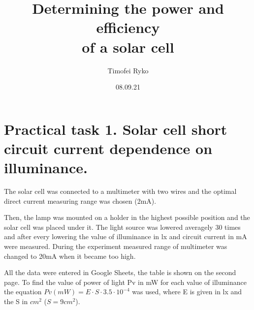 \documentclass[14pt, letterpaper]{article}
\title{Determining the power and efficiency\protect\\ of a solar cell}
\author{Timofei Ryko}
\date{08.09.21}
\begin{document}
\maketitle
\section{Practical task 1. Solar cell short circuit current dependence on illuminance.}
The solar cell was connected to a multimeter with two wires and the optimal direct current measuring range was chosen (2mA).
\par
Then, the lamp was mounted on a holder in the highest possible position and the solar cell was placed under it. The light source was lowered averagely 30 times and after every lowering the value of illuminance in lx and circuit current in mA were measured. During the experiment measured range of multimeter was changed to 20mA when it became too high.
\par
All the data were entered in Google Sheets, the table is shown on the second page. To find the value of power of light Pv in mW for each value of illuminance the equation $Pv (mW) = E \cdot S \cdot 3.5 \cdot 10^{-4}$ was used, where E is given in lx and the S in $cm^2$ ($S = 9cm^2$).
\end{document}
